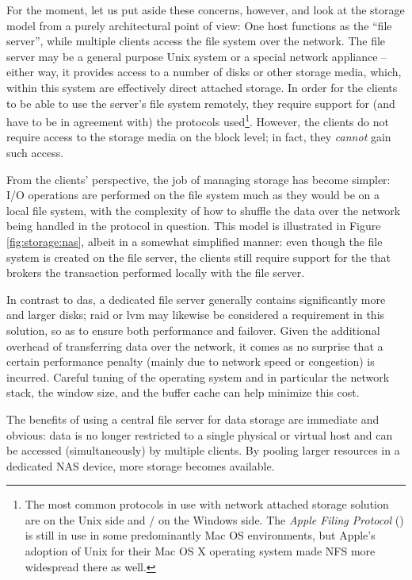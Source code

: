 For the moment, let us put aside these concerns,
however, and look at the storage model from a purely
architectural point of view:  One host functions as
the ``file server'', while multiple clients access the
file system over the network.  The file server may be
a general purpose Unix system or a special network
appliance -- either way, it provides access to a
number of disks or other storage media, which, within
this system are effectively direct attached storage.
In order for the clients to be able to use the
server's file system remotely, they require support
for (and have to be in agreement with) the protocols
used\footnote{The most common protocols in use with
network attached storage solution are
 on the Unix side and
/
on the Windows side.  The {\em Apple Filing Protocol}
() is still in use in
some predominantly Mac OS environments, but Apple's
adoption of Unix for their Mac OS X operating system
made NFS more widespread there as well.}. However, the
clients do not require access to the storage media on
the block level; in fact, they {\em cannot} gain such
access.

From the clients' perspective, the job of managing
storage has become simpler:  I/O operations are
performed on the file system much as they would be on
a local file system, with the complexity of how to
shuffle the data over the network being handled in the
protocol in question.  This model is illustrated in
Figure \ref{fig:storage:nas}, albeit in a somewhat
simplified manner:  even though the file system is
created on the file server, the clients still require
support for the {\em {}} that 
brokers the transaction performed locally with the
file server.

In contrast to \gls{das}, a dedicated file server
generally contains significantly more and larger
disks; \gls{raid} or \gls{lvm} may likewise
be considered a requirement in this solution, so as to
ensure both performance and failover.  Given the
additional overhead of transferring data over the
network, it comes as no surprise that a certain
performance penalty (mainly due to network speed or
congestion) is incurred.  Careful tuning of the
operating system and in particular the network stack,
the  window size, and the
buffer cache can help minimize this cost.

The benefits of using a central file server for data
storage are immediate and obvious: data is no longer
restricted to a single physical or virtual host and
can be accessed (simultaneously) by multiple clients.
By pooling larger resources in a dedicated NAS device,
more storage becomes available.

